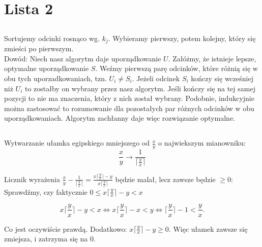 \chapter{Lista 2}
\section{} %

\section{} %

Sortujemy odcinki rosnąco wg. $k_j$. Wybieramy pierwszy, potem kolejny, który się zmieści po pierwszym.\\

\noindent Dowód: Niech nasz algorytm daje uporządkowanie $U$. Załóżmy, że istnieje lepsze, optymalne uporządkowanie $S$. Weźmy pierwszą parę odcinków, które różnią się w obu tych uporzadkowaniach, tzn. $U_i \ne S_i$. Jeżeli odcinek $S_i$ kończy się wcześniej niż $U_i$ to zostałby on wybrany przez nasz algorytm. Jeśli kończy się na tej samej pozycji to nie ma znaczenia, który z nich został wybrany. Podobnie, indukcyjnie można zastosować to rozumowanie dla pozostałych par różnych odcinków w obu uporządkowaniach. Algorytm zachłanny daje więc rozwiązanie optymalne.

\section{} %

Wytwarzanie ułamka egipskiego mniejszego od $\frac{x}{y}$ o najwiekszym mianowniku: 
\[\frac{x}{y} \rightarrow \frac{1}{\lceil \frac{y}{x} \rceil}\]

\noindent Licznik wyrażenia $\frac{x}{y} - \frac{1}{\lceil \frac{y}{x} \rceil} = \frac{x \lceil \frac{y}{x} \rceil - y}{x\lceil \frac{y}{x} \rceil}$ będzie malał, lecz zawsze będzie $\ge 0$:\\

\noindent Sprawdźmy, czy faktycznie $ 0 \leq x \lceil \frac{y}{x} \rceil - y < x$

\[x \lceil \frac{y}{x} \rceil - y < x \Leftrightarrow x \lceil \frac{y}{x} \rceil - x < y \Leftrightarrow \lceil \frac{y}{x} \rceil - 1 < \frac{y}{x} \textrm{.}\]

\noindent Co jest oczywiście prawdą. Dodatkowo: $x \lceil \frac{y}{x} \rceil - y \ge 0$. Więc ułamek zawsze się zmiejsza, i zatrzyma się na $0$.

